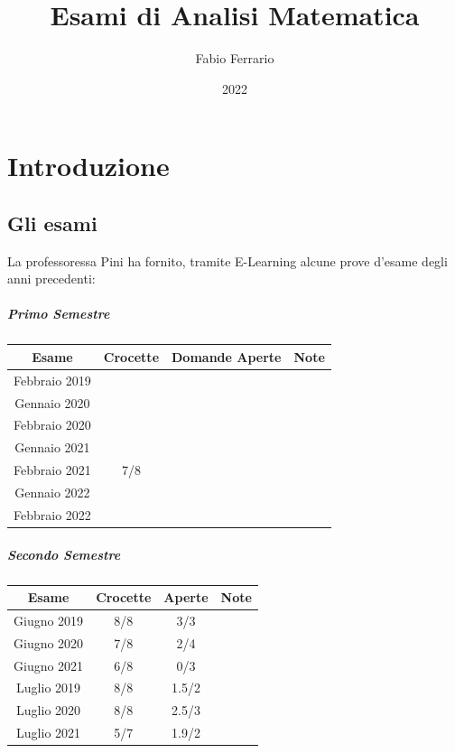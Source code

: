 \documentclass[12pt, a4paper, openany]{book}
\begin{document}
\title{Esami di Analisi Matematica}
\author{Fabio Ferrario}
\date{2022}
\maketitle
\tableofcontents

\chapter{Introduzione}
\section{Gli esami}
La professoressa Pini ha fornito, tramite E-Learning alcune prove d'esame degli anni precedenti:
\paragraph*{Primo Semestre}
\begin{tabular}{ |c|c|c|c| }
	\hline
	Esame         & Crocette   & Domande Aperte & Note \\
	\hline
	Febbraio 2019 &            &                &      \\
	Gennaio 2020  &            &                &      \\
	Febbraio 2020 & \checkmark &                &      \\
	Gennaio 2021  &            &                &      \\
	Febbraio 2021 & 7/8        &                &      \\
	Gennaio 2022  &            &                &      \\
	Febbraio 2022 &            &                &      \\
	\hline
\end{tabular}
\paragraph*{Secondo Semestre}
\begin{tabular}{ |c|c|c|c| }
	\hline
	Esame       & Crocette & Aperte & Note                                 \\
	\hline
	Giugno 2019 & 8/8      & 3/3    &   \\
	Giugno 2020 & 7/8      & 2/4    &                                      \\
	Giugno 2021 & 6/8      & 0/3    &                                      \\
	Luglio 2019 & 8/8      & 1.5/2    & \\
	Luglio 2020 & 8/8      & 2.5/3  &                                      \\
	Luglio 2021 & 5/7      & 1.9/2  &                                      \\
	\hline
\end{tabular}
\end{document}
